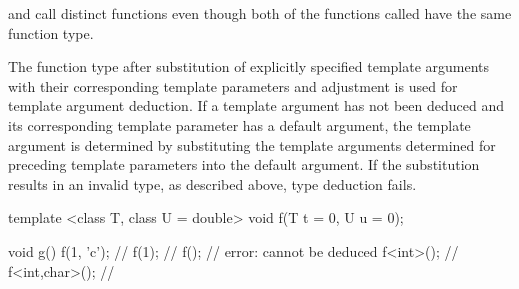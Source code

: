 \pnum
\begin{note}
 and  call distinct functions
even though both of the functions called have the same function type.
\end{note}

\pnum
The function type after substitution of explicitly specified template
arguments with their corresponding template parameters and adjustment
is used for template argument
deduction.  If a template argument has not been deduced and its
corresponding template parameter has a default argument, the
template argument is determined by substituting the template
arguments determined for preceding template parameters into the
default argument. If the substitution results in an invalid type,
as described above, type deduction fails.
\begin{example}
\begin{codeblock}
template <class T, class U = double>
void f(T t = 0, U u = 0);

void g() {
  f(1, 'c');        // 
  f(1);             // 
  f();              // error:  cannot be deduced
  f<int>();         // 
  f<int,char>();    // 
}
\end{codeblock}
\end{example}

